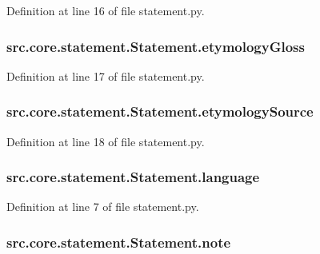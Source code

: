 Definition at line 16 of file statement.\+py.

\hypertarget{classsrc_1_1core_1_1statement_1_1_statement_ac5b1ca26900e8f0d6407658195820157}{
\subsubsection[{etymology\+Gloss}]{\setlength{\rightskip}{0pt plus 5cm}src.\+core.\+statement.\+Statement.\+etymology\+Gloss}}\label{classsrc_1_1core_1_1statement_1_1_statement_ac5b1ca26900e8f0d6407658195820157}


Definition at line 17 of file statement.\+py.

\hypertarget{classsrc_1_1core_1_1statement_1_1_statement_afb34d7f04ad71ed5a0fe62932305f743}{
\subsubsection[{etymology\+Source}]{\setlength{\rightskip}{0pt plus 5cm}src.\+core.\+statement.\+Statement.\+etymology\+Source}}\label{classsrc_1_1core_1_1statement_1_1_statement_afb34d7f04ad71ed5a0fe62932305f743}


Definition at line 18 of file statement.\+py.

\hypertarget{classsrc_1_1core_1_1statement_1_1_statement_a62916eea6e03f2115544f9fd6d8042fc}{
\subsubsection[{language}]{\setlength{\rightskip}{0pt plus 5cm}src.\+core.\+statement.\+Statement.\+language}}\label{classsrc_1_1core_1_1statement_1_1_statement_a62916eea6e03f2115544f9fd6d8042fc}


Definition at line 7 of file statement.\+py.

\hypertarget{classsrc_1_1core_1_1statement_1_1_statement_a2edc72dff8f04376c6f09fc9a270503b}{
\subsubsection[{note}]{\setlength{\rightskip}{0pt plus 5cm}src.\+core.\+statement.\+Statement.\+note}}\label{classsrc_1_1core_1_1statement_1_1_statement_a2edc72dff8f04376c6f09fc9a270503b}


